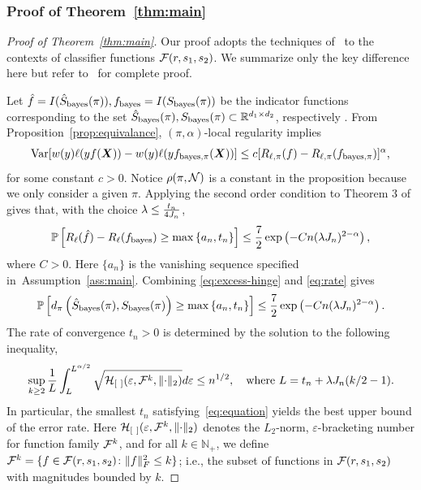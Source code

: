 \documentclass[11pt]{article}
\theoremstyle{plain}
\theoremstyle{definition}
\def\bayesf{f_{\textup{bayes}}}
\def\bayesS{S_{\textup{bayes}}}
\def\bayespif{f_{\textup{bayes},\pi}}
\begin{document}
\subsubsection{Proof of Theorem~\ref{thm:main}}
\begin{proof}[Proof of Theorem~\ref{thm:main}]
Our proof adopts the techniques of~\citet[Theorem 3]{wang2008probability} to the contexts of classifier functions $\mathcal{F}(r,s_1,s_2)$. We summarize only the key difference here but refer to~\cite{wang2008probability} for complete proof. 

Let $\hat f = I(\hat S_{\text{bayes}}(\pi)),\bayesf = I(\bayesS(\pi))$ be the indicator functions corresponding to the set $\hat S_{\text{bayes}}(\pi),\bayesS(\pi)\subset \mathbb{R}^{d_1\times d_2}$, respectively .
From Proposition~\ref{prop:equivalance},  $(\pi,\alpha)$-local regularity implies 
\begin{align}
\text{Var}[w(y)\ell(yf(\mX))-w(y)\ell(y\bayespif(\mX))]\leq c[R_{\ell,\pi}(f)-R_{\ell,\pi}(\bayespif)]^\alpha,
\end{align}
for some constant $c>0$.  Notice $\rho(\pi,\mathcal{N})$ is a constant in the proposition because we only consider a given $\pi$.
Applying the second order condition to Theorem 3 of \cite{wang2008probability} gives that, with the choice $\lambda\leq {t_n\over 4J_n}$, 
\begin{equation}\label{eq:rate}
\mathbb{P}\left[R_\ell(\hat f)-R_\ell(\bayesf)\geq \max\left\{a_n, t_n\right\}\right]\leq {7\over 2}\exp\left( -Cn(\lambda J_n)^{2-\alpha}\right), 
\end{equation}
where $C>0$. Here $\{a_n\}$ is the vanishing sequence specified in~Assumption~\ref{ass:main}. Combining \eqref{eq:excess-hinge} and \eqref{eq:rate} gives
\begin{equation}
\mathbb{P}\left[d_\pi\left(\hat S_{\text{bayes}}(\pi),\bayesS(\pi)\right)\geq \max\left\{a_n, t_n\right\}\right]\leq {7\over 2}\exp\left( -Cn(\lambda J_n)^{2-\alpha}\right).
\end{equation}
The rate of convergence $t_n>0$ is determined by the solution to the following inequality,
\begin{equation}\label{eq:equation}
\sup_{k\geq 2}{1\over L}\int_{L}^{L^{\alpha/2}}\sqrt{\tH_{[\ ]}(\varepsilon, \tF^{k},\vnormSize{}{\cdot})}d\varepsilon \leq n^{1/2}, \quad \text{where }L=t_n+\lambda J_n(k/2-1).
\end{equation}
In particular, the smallest $t_n$ satisfying~\eqref{eq:equation} yields the best upper bound of the error rate. Here $\tH_{[\ ]}(\varepsilon, \tF^{k}, \vnormSize{}{\cdot})$ denotes the $L_2$-norm, $\varepsilon$-bracketing number for function family $\mathcal{F}^{k}$, and for all $k\in \mathbb{N}_{+}$, we define $\mathcal{F}^{k}=\{f\in\mathcal{F}(r,s_1,s_2)\colon \lVert f\rVert_F^2\leq k\}$; i.e., the subset of functions in $\mathcal{F}(r,s_1,s_2)$ with magnitudes bounded by $k$. 


\end{proof}
\end{document}

